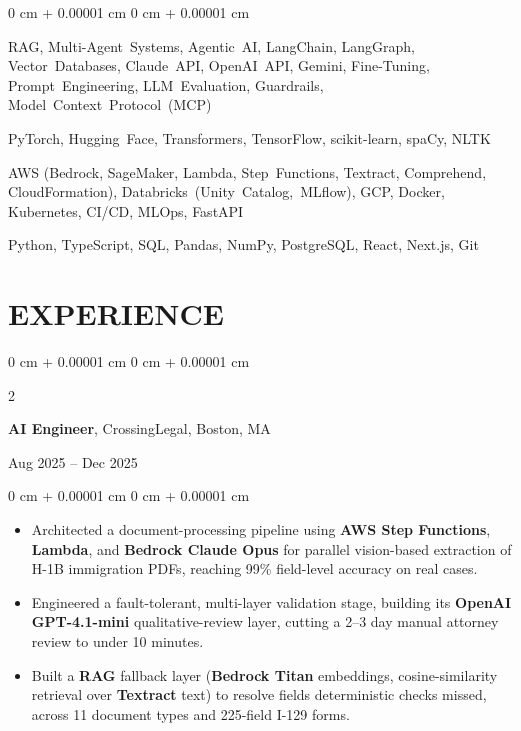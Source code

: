 \documentclass[9pt, letterpaper]{extarticle}
\newenvironment{highlights}{
    \linespread{1.05}\selectfont
    \begin{itemize}[
        topsep=0.02 cm,
        parsep=0.02 cm,
        partopsep=0pt,
        itemsep=0.5pt,
        leftmargin=0.5em + 10pt
    ]
}{
    \end{itemize}
} %
\newenvironment{onecolentry}{
    \begin{adjustwidth}{
        0 cm + 0.00001 cm
    }{
        0 cm + 0.00001 cm
    }
}{
    \end{adjustwidth}
} %
\newenvironment{twocolentry}[2][]{
    \onecolentry
    \def\secondColumn{#2}
    \setcolumnwidth{\fill, 4.5 cm}
    \begin{paracol}{2}
}{
    \switchcolumn \raggedleft \secondColumn
    \end{paracol}
    \endonecolentry
} %
\begin{document}
        \begin{onecolentry}
            \newlength{\skilllabel}%
            \begin{description}[labelwidth=\skilllabel, leftmargin=\skilllabel, labelsep=0pt, font=\bfseries, style=sameline, itemsep=2pt, parsep=0pt, topsep=0pt]
                \item[LLM \& GenAI:] RAG, Multi-Agent~Systems, Agentic~AI, LangChain, LangGraph, Vector~Databases, Claude~API, OpenAI~API, Gemini, Fine-Tuning, Prompt~Engineering, LLM~Evaluation, Guardrails, Model~Context~Protocol~(MCP)
                \item[ML \& NLP:] PyTorch, Hugging~Face, Transformers, TensorFlow, scikit-learn, spaCy, NLTK
                \item[Cloud \& MLOps:] AWS (Bedrock, SageMaker, Lambda, Step~Functions, Textract, Comprehend, CloudFormation), Databricks~(Unity~Catalog,~MLflow), GCP, Docker, Kubernetes, CI/CD, MLOps, FastAPI
                \item[Languages \& Tools:] Python, TypeScript, SQL, Pandas, NumPy, PostgreSQL, React, Next.js, Git
            \end{description}
        \end{onecolentry}


    \section{EXPERIENCE}

        \begin{twocolentry}{
            Aug 2025 – Dec 2025
        }
            \textbf{AI Engineer}, CrossingLegal, Boston, MA
        \end{twocolentry}

        \vspace{0.04 cm}
        \begin{onecolentry}
            \begin{highlights}
                \item Architected a document-processing pipeline using \textbf{AWS Step Functions}, \textbf{Lambda}, and \textbf{Bedrock Claude Opus} for parallel vision-based extraction of H-1B immigration PDFs, reaching 99\% field-level accuracy on real cases.
                \item Engineered a fault-tolerant, multi-layer validation stage, building its \textbf{OpenAI GPT-4.1-mini} qualitative-review layer, cutting a 2--3 day manual attorney review to under 10 minutes.
                \item Built a \textbf{RAG} fallback layer (\textbf{Bedrock Titan} embeddings, cosine-similarity retrieval over \textbf{Textract} text) to resolve fields deterministic checks missed, across 11 document types and 225-field I-129 forms.
            \end{highlights}
        \end{onecolentry}
\end{document}
